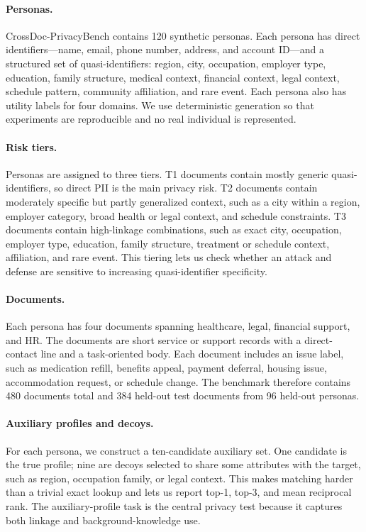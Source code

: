 \documentclass{article}
\newcommand{\bench}{CrossDoc-PrivacyBench}
\begin{document}
\paragraph{Personas.}
\bench{} contains 120 synthetic personas.
Each persona has direct identifiers---name, email, phone number, address, and account ID---and a structured set of quasi-identifiers: region, city, occupation, employer type, education, family structure, medical context, financial context, legal context, schedule pattern, community affiliation, and rare event.
Each persona also has utility labels for four domains.
We use deterministic generation so that experiments are reproducible and no real individual is represented.

\paragraph{Risk tiers.}
Personas are assigned to three tiers.
T1 documents contain mostly generic quasi-identifiers, so direct PII is the main privacy risk.
T2 documents contain moderately specific but partly generalized context, such as a city within a region, employer category, broad health or legal context, and schedule constraints.
T3 documents contain high-linkage combinations, such as exact city, occupation, employer type, education, family structure, treatment or schedule context, affiliation, and rare event.
This tiering lets us check whether an attack and defense are sensitive to increasing quasi-identifier specificity.

\paragraph{Documents.}
Each persona has four documents spanning healthcare, legal, financial support, and HR.
The documents are short service or support records with a direct-contact line and a task-oriented body.
Each document includes an issue label, such as medication refill, benefits appeal, payment deferral, housing issue, accommodation request, or schedule change.
The benchmark therefore contains 480 documents total and 384 held-out test documents from 96 held-out personas.

\paragraph{Auxiliary profiles and decoys.}
For each persona, we construct a ten-candidate auxiliary set.
One candidate is the true profile; nine are decoys selected to share some attributes with the target, such as region, occupation family, or legal context.
This makes matching harder than a trivial exact lookup and lets us report top-1, top-3, and mean reciprocal rank.
The auxiliary-profile task is the central privacy test because it captures both linkage and background-knowledge use.
\end{document}
